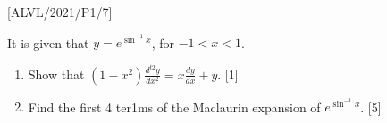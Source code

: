 \item {[}ALVL/2021/P1/7{]}

It is given that $y=e^{\sin^{-1}x}$, for $-1<x<1$. 
\begin{enumerate}
\item Show that $\left(1-x^{2}\right)\frac{d^{t2}y}{dx^{2}}=x\frac{dy}{dx}+y$.\hfill{}
{[}1{]}
\item Find the first 4 ter1ms of the Maclaurin expansion of $e^{\sin^{-1}x}$.
\hfill{}{[}5{]}
\end{enumerate}
